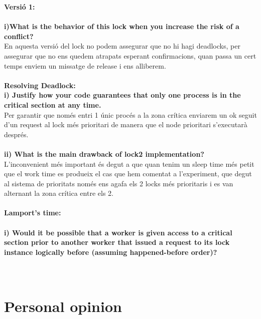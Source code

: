 \documentclass[a4paper, 10pt]{article}
\begin{document}
\begin{itemize}



\textbf{Versió 1:}\\
\\
\textbf{i)What is the behavior of this lock when you increase
the risk of a conflict?\\}
En aquesta versió del lock no podem assegurar que no hi hagi deadlocks, per assegurar que no ens quedem atrapats esperant confirmacions, quan passa un cert temps enviem un missatge de release i ens alliberem.
\\
\\
\textbf{Resolving Deadlock:}\\

\textbf{i) Justify how your code guarantees that only one
process is in the critical section at any time.}\\
Per garantir que només entri 1 únic procés a la zona crítica enviarem un ok seguit d'un request al lock més prioritari de manera que el node prioritari s'executarà després.\\
\\
\textbf{ii)  What is the main drawback
of lock2 implementation?}\\ 
L'inconvenient més important és degut a que quan tenim un sleep time més petit que el work time es produeix el cas que hem comentat a l'experiment, que degut al sistema de prioritats només ens agafa els 2 locks més prioritaris i es van alternant la zona crítica entre els 2.
\\
\\
\textbf{Lamport’s time:}\\
\\
\textbf{i)  Would it be possible that a worker is given
access to a critical section prior to another worker that issued a request to its lock instance logically before (assuming happened-before order)?\\}\\
\\



\end{itemize}

\section{Personal opinion}

\item{}
\end{document}
